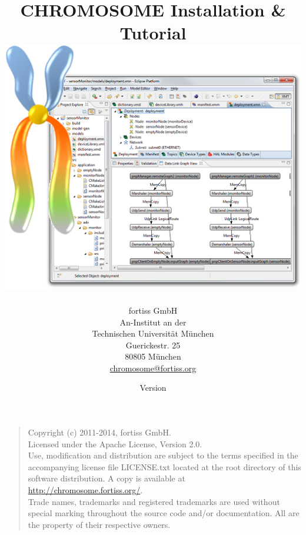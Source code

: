 \documentclass[11pt,twoside,a4paper]{article}
\title{\textsf{CHROMOSOME Installation \& Tutorial} \\[12pt] \includegraphics[width=.7\textwidth]{figures/xme_xmt.png}}
\author{%
	fortiss GmbH\\[6pt]
	An-Institut an der\\
	Technischen Universit\"at M\"unchen\\[6pt]
	Guerickestr. 25\\
	80805 M\"unchen\\[6pt]
	\url{chromosome@fortiss.org}
}
\date{Version \xmeVersionNumber{} \xmeVersionSuffixCaps{}\\\xmeVersionDate{}}
\begin{document}
\maketitle

\vfill
\begin{quote}
Copyright (c) 2011-2014, fortiss GmbH.\\
Licensed under the Apache License, Version 2.0.\\[6pt]

Use, modification and distribution are subject to the terms specified
in the accompanying license file LICENSE.txt located at the root directory
of this software distribution. A copy is available at
\url{http://chromosome.fortiss.org/}.\\[6pt]

Trade names, trademarks and registered trademarks are used without special marking throughout the source code and/or documentation.
All are the property of their respective owners.
\end{quote}

\newpage
\tableofcontents
\newpage


\clearpage

\clearpage

\clearpage

\clearpage

\clearpage

\clearpage

\clearpage

\clearpage

\clearpage

%
%


\clearpage
\appendix


\clearpage

\clearpage

\clearpage

\clearpage

\clearpage

\clearpage

\end{document}
